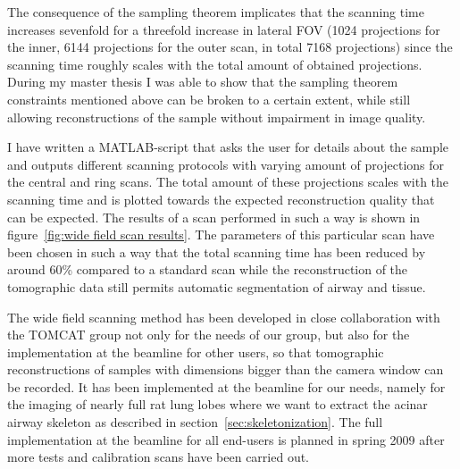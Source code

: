 \documentclass[]{scrartcl}
\begin{document}
The consequence of the sampling theorem implicates that the scanning time increases sevenfold for a threefold increase in lateral FOV (1024 projections for the inner, 6144 projections for the outer scan, in total 7168 projections) since the scanning time roughly scales with the total amount of obtained projections. During my master thesis I was able to show that the sampling theorem constraints mentioned above can be broken to a certain extent, while still allowing reconstructions of the sample without impairment in image quality.

I have written a MATLAB-script that asks the user for details about the sample and outputs different scanning protocols with varying amount of projections for the central and ring scans. The total amount of these projections scales with the scanning time and is plotted towards the expected reconstruction quality that can be expected. The results of a scan performed in such a way is shown in figure~\ref{fig:wide field scan results}. The parameters of this particular scan have been chosen in such a way that the total scanning time has been reduced by around \unit{60}{\%} compared to a standard scan while the reconstruction of the tomographic data still permits automatic segmentation of airway and tissue.

The wide field scanning method has been developed in close collaboration with the TOMCAT group not only for the needs of our group, but also for the implementation at the beamline for other users, so that tomographic reconstructions of samples with dimensions bigger than the camera window can be recorded. It has been implemented at the beamline for our needs, namely for the imaging of nearly full rat lung lobes where we want to extract the acinar airway skeleton as described in section~\ref{sec:skeletonization}. The full implementation at the beamline for all end-users is planned in spring 2009 after more tests and calibration scans have been carried out.
\end{document}
